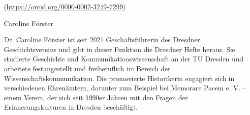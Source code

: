 \documentclass[a4paper,
fontsize=11pt,
oneside,
numbers=noperiodatend,
parskip=half-,
bibliography=totoc,
final
]{scrartcl}
\begin{document}
(\url{https://orcid.org/0000-0002-3249-7299})

\newpage

Caroline Förster

Dr. Caroline Förster ist seit 2021 Geschäftsführerin des Dresdner Geschichtsvereins und gibt in dieser Funktion 
die Dresdner Hefte heraus. Sie studierte Geschichte und Kommunikationswissenschaft an der TU Dresden und arbeitete 
festangestellt und freiberuflich im Bereich der Wissenschaftskommunikation. Die promovierte Historikerin engagiert 
sich in verschiedenen Ehrenämtern, darunter zum Beispiel bei Memorare Pacem e. V. – einem Verein, der sich seit 1990er 
Jahren mit den Fragen der Erinnerungskulturen in Dresden beschäftigt.
\end{document}
